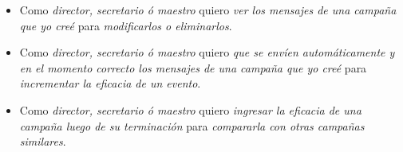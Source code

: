\documentclass[a4paper, 10pt, twoside]{article}
\newenvironment{stories}{
  \begin{itemize}
}{
  \end{itemize}
}
\newcommand{\story}[3]{
  \item
  Como \emph{#1} quiero \emph{#2} para \emph{#3}.
}
\begin{document}
\begin{stories}
  \story{director, secretario ó maestro}
        {ver los mensajes de una campaña que yo creé}
        {modificarlos o eliminarlos}

  \story{director, secretario ó maestro}
        {que se envíen automáticamente y en el momento correcto los mensajes de una campaña que yo creé}
        {incrementar la eficacia de un evento}

  \story{director, secretario ó maestro}
        {ingresar la eficacia de una campaña luego de su terminación}
        {compararla con otras campañas similares}
\end{stories}
\end{document}
